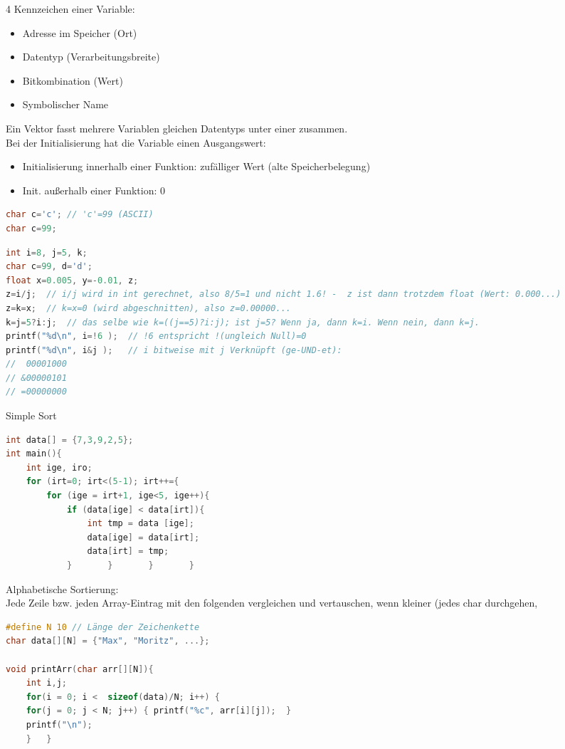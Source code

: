 \begin{multicols*}{3}
4 Kennzeichen einer Variable:
\begin{itemize}
\item Adresse im Speicher (Ort)
\item Datentyp (Verarbeitungsbreite)
\item Bitkombination (Wert)
\item Symbolischer Name
\end{itemize}
Ein Vektor fasst mehrere Variablen gleichen Datentyps unter einer zusammen.\smallskip\\
Bei der Initialisierung hat die Variable einen Ausgangswert:
\begin{itemize}
\item Initialisierung innerhalb einer Funktion: zufälliger Wert (alte Speicherbelegung)
\item Init. außerhalb einer Funktion: 0
\end{itemize}
\begin{lstlisting}[language=C]
char c='c';	// 'c'=99 (ASCII)
char c=99;
\end{lstlisting}
\begin{lstlisting}[language=C]
int i=8, j=5, k;
char c=99, d='d';
float x=0.005, y=-0.01, z;
z=i/j;	// i/j wird in int gerechnet, also 8/5=1 und nicht 1.6! -  z ist dann trotzdem float (Wert: 0.000...)
z=k=x;	// k=x=0 (wird abgeschnitten), also z=0.00000...
k=j=5?i:j;	// das selbe wie k=((j==5)?i:j); ist j=5? Wenn ja, dann k=i. Wenn nein, dann k=j.
printf("%d\n", i=!6 );	// !6 entspricht !(ungleich Null)=0
printf("%d\n", i&j );	// i bitweise mit j Verknüpft (ge-UND-et):
//  00001000
// &00000101
// =00000000
\end{lstlisting}
\HRule[4pt]
Simple Sort
\begin{lstlisting}[language=C]
int data[] = {7,3,9,2,5};
int main(){
	int ige, iro;
	for (irt=0; irt<(5-1); irt++={
		for (ige = irt+1, ige<5, ige++){
			if (data[ige] < data[irt]){
				int tmp = data [ige];
				data[ige] = data[irt];
				data[irt] = tmp;
			}		}		}		}
\end{lstlisting}
Alphabetische Sortierung:\\
Jede Zeile bzw. jeden Array-Eintrag mit den folgenden vergleichen und vertauschen, wenn kleiner (jedes char durchgehen, 
\begin{lstlisting}[language=C]
#define N 10 // Länge der Zeichenkette
char data[][N] = {"Max", "Moritz", ...};

void printArr(char arr[][N]){
	int i,j;
	for(i = 0; i <  sizeof(data)/N; i++) {
    for(j = 0; j < N; j++) { printf("%c", arr[i][j]);  }
    printf("\n");
	}	}


\end{lstlisting}
\end{multicols*}
